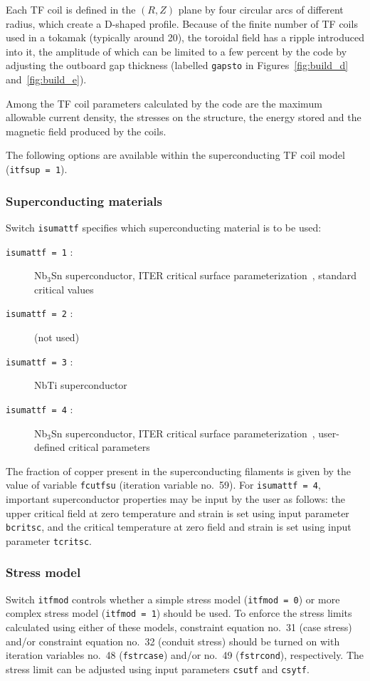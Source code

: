 \documentclass[11pt,a4paper]{report}
\begin{document}
Each TF coil is defined in the $(R,Z)$ plane by four circular arcs of
different radius, which create a D-shaped profile. Because of the finite
number of TF coils used in a tokamak (typically around 20), the toroidal field
has a ripple introduced into it, the amplitude of which can be limited to a
few percent by the code by adjusting the outboard gap thickness (labelled
\texttt{gapsto} in Figures~\ref{fig:build_d} and~\ref{fig:build_e}).

Among the TF coil parameters calculated by the code are the maximum allowable
current density, the stresses on the structure, the energy stored and the
magnetic field produced by the coils.

The following options are available within the superconducting TF coil model
(\texttt{itfsup = 1}).

\subsubsection{Superconducting materials}

Switch \texttt{isumattf} specifies which superconducting material is to be
used:
\begin{description}
\item [\texttt{isumattf = 1} :] Nb$_3$Sn superconductor, ITER critical surface
  parameterization~\cite{iter_nb3sn}, standard critical values
\item [\texttt{isumattf = 2} :] (not used)
\item [\texttt{isumattf = 3} :] NbTi superconductor
\item [\texttt{isumattf = 4} :] Nb$_3$Sn superconductor, ITER critical surface
  parameterization~\cite{iter_nb3sn}, user-defined critical parameters
\end{description}
The fraction of copper present in the superconducting filaments is given by
the value of variable \texttt{fcutfsu} (iteration variable no.\ 59). For
\texttt{isumattf = 4}, important superconductor properties may be input by the
user as follows: the upper critical field at zero temperature and strain is
set using input parameter \texttt{bcritsc}, and the critical temperature at
zero field and strain is set using input parameter \texttt{tcritsc}.

\subsubsection{Stress model}

Switch \texttt{itfmod} controls whether a simple stress model (\texttt{itfmod
  = 0}) or more complex stress model (\texttt{itfmod = 1}) should be used. To
enforce the stress limits calculated using either of these models, constraint
equation no.\ 31 (case stress) and/or constraint equation no.\ 32 (conduit
stress) should be turned on with iteration variables no.\ 48
(\texttt{fstrcase}) and/or no.\ 49 (\texttt{fstrcond}), respectively. The
stress limit can be adjusted using input parameters \texttt{csutf} and
\texttt{csytf}.
\end{document}
